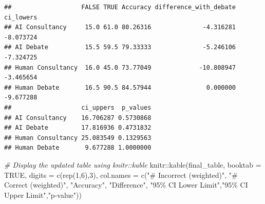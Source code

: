 \documentclass[
]{article}
\newenvironment{Shaded}{\begin{snugshade}}{\end{snugshade}}
\newcommand{\AttributeTok}[1]{\textcolor[rgb]{0.77,0.63,0.00}{#1}}
\newcommand{\CommentTok}[1]{\textcolor[rgb]{0.56,0.35,0.01}{\textit{#1}}}
\newcommand{\ConstantTok}[1]{\textcolor[rgb]{0.00,0.00,0.00}{#1}}
\newcommand{\DecValTok}[1]{\textcolor[rgb]{0.00,0.00,0.81}{#1}}
\newcommand{\FunctionTok}[1]{\textcolor[rgb]{0.00,0.00,0.00}{#1}}
\newcommand{\NormalTok}[1]{#1}
\newcommand{\OtherTok}[1]{\textcolor[rgb]{0.56,0.35,0.01}{#1}}
\newcommand{\SpecialCharTok}[1]{\textcolor[rgb]{0.00,0.00,0.00}{#1}}
\newcommand{\StringTok}[1]{\textcolor[rgb]{0.31,0.60,0.02}{#1}}
\begin{document}
\begin{Shaded}
\end{Shaded}

\begin{verbatim}
##                   FALSE TRUE Accuracy difference_with_debate ci_lowers
## AI Consultancy     15.0 61.0 80.26316              -4.316281 -8.073724
## AI Debate          15.5 59.5 79.33333              -5.246106 -7.324725
## Human Consultancy  16.0 45.0 73.77049             -10.808947 -3.465654
## Human Debate       16.5 90.5 84.57944               0.000000 -9.677288
##                   ci_uppers  p_values
## AI Consultancy    16.706287 0.5730868
## AI Debate         17.816936 0.4731832
## Human Consultancy 25.083549 0.1329563
## Human Debate       9.677288 1.0000000
\end{verbatim}

\begin{Shaded}
\begin{Highlighting}[]
\CommentTok{\# Display the updated table using knitr::kable}
\NormalTok{knitr}\SpecialCharTok{::}\FunctionTok{kable}\NormalTok{(final\_table, }\AttributeTok{booktab =} \ConstantTok{TRUE}\NormalTok{,  }\AttributeTok{digits =} \FunctionTok{c}\NormalTok{(}\FunctionTok{rep}\NormalTok{(}\DecValTok{1}\NormalTok{,}\DecValTok{6}\NormalTok{),}\DecValTok{3}\NormalTok{),}
             \AttributeTok{col.names =} \FunctionTok{c}\NormalTok{(}\StringTok{"\# Incorrect (weighted)"}\NormalTok{, }\StringTok{"\# Correct (weighted)"}\NormalTok{, }\StringTok{"Accuracy"}\NormalTok{, }\StringTok{"Difference"}\NormalTok{, }\StringTok{"95\% CI Lower Limit"}\NormalTok{,}\StringTok{"95\% CI Upper Limit"}\NormalTok{,}\StringTok{"p{-}value"}\NormalTok{))}
\end{Highlighting}
\end{Shaded}
\end{document}
